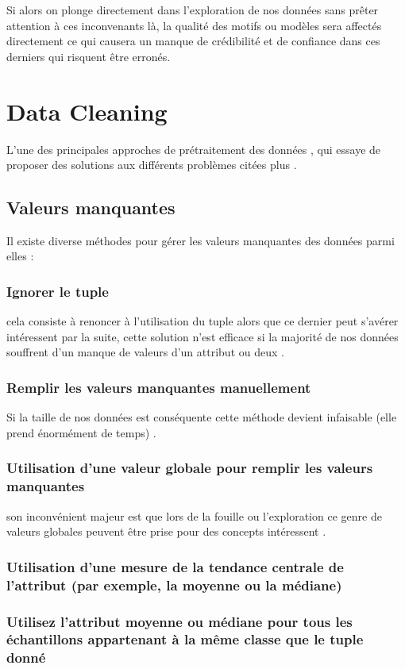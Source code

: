\documentclass[12pt,a4paper,oneside]{book}
\begin{document}
Si alors on plonge  directement dans l'exploration de nos données sans prêter attention à ces inconvenants là, la qualité des motifs ou modèles  sera affectés directement  ce qui causera un manque de crédibilité et de confiance dans ces derniers qui risquent être erronés.

\section{Data Cleaning}
L'une des principales approches de prétraitement des données , qui essaye de proposer des solutions aux différents problèmes citées plus .

\subsection{Valeurs manquantes}
Il existe diverse méthodes pour gérer les valeurs manquantes des données parmi elles :
\subsubsection{Ignorer le tuple}
cela consiste à renoncer à l'utilisation du tuple alors que ce dernier peut s'avérer intéressent par la suite, cette solution n'est efficace si la majorité de nos données souffrent d'un manque de valeurs d'un attribut ou deux .
\subsubsection{Remplir les valeurs manquantes manuellement}
Si la taille de nos données est conséquente cette méthode devient infaisable (elle prend énormément de temps) .
\subsubsection{Utilisation d'une valeur globale pour remplir les valeurs manquantes}
son inconvénient majeur est que lors de la fouille ou l'exploration ce genre de  valeurs globales peuvent être prise pour des concepts intéressent .
\subsubsection{Utilisation d'une mesure de la tendance centrale de l'attribut (par exemple, la moyenne ou la médiane)}
\subsubsection{Utilisez l'attribut moyenne ou médiane pour tous les échantillons appartenant à la même classe que le tuple donné }
\end{document}
